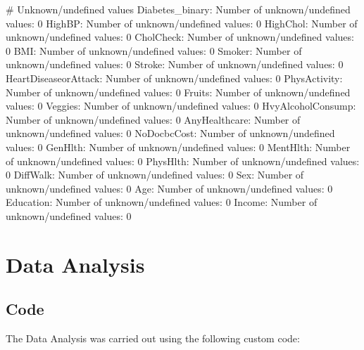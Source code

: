 \documentclass[11pt]{article}
\begin{document}
\begin{codeoutput}
# Unknown/undefined values
Diabetes_binary: Number of unknown/undefined values: 0
HighBP: Number of unknown/undefined values: 0
HighChol: Number of unknown/undefined values: 0
CholCheck: Number of unknown/undefined values: 0
BMI: Number of unknown/undefined values: 0
Smoker: Number of unknown/undefined values: 0
Stroke: Number of unknown/undefined values: 0
HeartDiseaseorAttack: Number of unknown/undefined values: 0
PhysActivity: Number of unknown/undefined values: 0
Fruits: Number of unknown/undefined values: 0
Veggies: Number of unknown/undefined values: 0
HvyAlcoholConsump: Number of unknown/undefined values: 0
AnyHealthcare: Number of unknown/undefined values: 0
NoDocbcCost: Number of unknown/undefined values: 0
GenHlth: Number of unknown/undefined values: 0
MentHlth: Number of unknown/undefined values: 0
PhysHlth: Number of unknown/undefined values: 0
DiffWalk: Number of unknown/undefined values: 0
Sex: Number of unknown/undefined values: 0
Age: Number of unknown/undefined values: 0
Education: Number of unknown/undefined values: 0
Income: Number of unknown/undefined values: 0

\end{codeoutput}

\section{Data Analysis}
\subsection{{Code}}
The Data Analysis was carried out using the following custom code:
\end{document}
